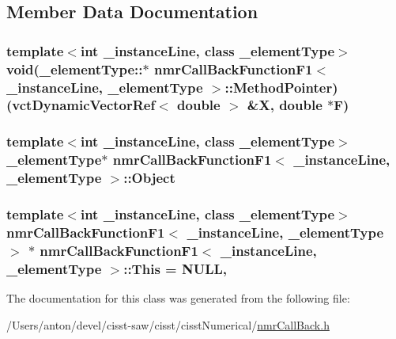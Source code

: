 \subsection{Member Data Documentation}
\hypertarget{classnmr_call_back_function_f1_ab21956b8763a52d6e2b08a2ee0def382}{}
\subsubsection[{Method\+Pointer}]{\setlength{\rightskip}{0pt plus 5cm}template$<$int \+\_\+instance\+Line, class \+\_\+element\+Type$>$ void(\+\_\+element\+Type\+::$\ast$ {\bf nmr\+Call\+Back\+Function\+F1}$<$ \+\_\+instance\+Line, \+\_\+element\+Type $>$\+::Method\+Pointer) ({\bf vct\+Dynamic\+Vector\+Ref}$<$ double $>$ \&X, double $\ast$F)\hspace{0.3cm}{\ttfamily [protected]}}\label{classnmr_call_back_function_f1_ab21956b8763a52d6e2b08a2ee0def382}
\hypertarget{classnmr_call_back_function_f1_a65ebc32c3c8d280b0920dfbb27eb96d8}{}
\subsubsection[{Object}]{\setlength{\rightskip}{0pt plus 5cm}template$<$int \+\_\+instance\+Line, class \+\_\+element\+Type$>$ \+\_\+element\+Type$\ast$ {\bf nmr\+Call\+Back\+Function\+F1}$<$ \+\_\+instance\+Line, \+\_\+element\+Type $>$\+::Object\hspace{0.3cm}{\ttfamily [protected]}}\label{classnmr_call_back_function_f1_a65ebc32c3c8d280b0920dfbb27eb96d8}
\hypertarget{classnmr_call_back_function_f1_a9599c6b2e5c59a8bf504c59824714573}{}
\subsubsection[{This}]{\setlength{\rightskip}{0pt plus 5cm}template$<$int \+\_\+instance\+Line, class \+\_\+element\+Type$>$ {\bf nmr\+Call\+Back\+Function\+F1}$<$ \+\_\+instance\+Line, \+\_\+element\+Type $>$ $\ast$ {\bf nmr\+Call\+Back\+Function\+F1}$<$ \+\_\+instance\+Line, \+\_\+element\+Type $>$\+::This = N\+U\+L\+L\hspace{0.3cm}{\ttfamily [static]}, {\ttfamily [protected]}}\label{classnmr_call_back_function_f1_a9599c6b2e5c59a8bf504c59824714573}


The documentation for this class was generated from the following file\+:\begin{DoxyCompactItemize}
\item 
/\+Users/anton/devel/cisst-\/saw/cisst/cisst\+Numerical/\hyperlink{nmr_call_back_8h}{nmr\+Call\+Back.\+h}\end{DoxyCompactItemize}
